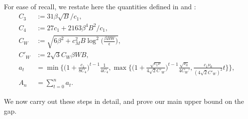 \documentclass[11pt]{article}
\numberwithin{thm}{section}
\theoremstyle{plain}
\theoremstyle{definition}
\theoremstyle{remark} \newtheorem{remark}[thm]{Remark}
\def\eps{{\epsilon}}
\begin{document}
For ease of recall, we restate here the quantities defined in  and :
\begin{align*}
    C_{3} &:=31\beta\sqrt{B}/c_{1},\\
    C_4&:=27c_1+2163\beta^4B^2/c_1,\\
    C_W&:=\sqrt{6\beta^2+c_M^2B\log^2\Big(\frac{\beta BW}{\eps}\Big)},\\
    C'_W&:=2\sqrt{3}C_W\beta WB,\\
    a_t &= \min\Big\{\Big(1+\frac{c_1}{8C_4}\Big)^{t-1}\frac{1}{4C_4},\max\Big\{\Big(1+\frac{\sqrt{c_1\nu}}{4\sqrt{2}C'_W}\Big)^{t-1}\frac{\sqrt{\nu_0}}{4C_W'},\frac{c_1\nu_0}{(4\sqrt{2}C'_W)^2}t\Big\}\Big\},\\
    A_n&=\sum_{t=0}^na_t.
\end{align*}

We now carry out these steps in detail, and prove our main upper bound on the gap.

\lemgapub*
\end{document}
